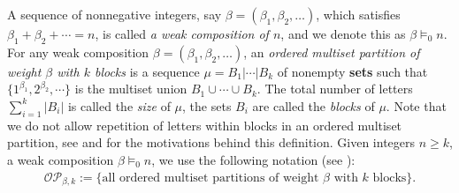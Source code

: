 \documentclass[12pt]{amsart}
\numberwithin{equation}{section}
\theoremstyle{plain}
\theoremstyle{definition}
\def\OP{\mathcal{OP}}
\begin{document}
A sequence of nonnegative integers, say $\beta=(\beta_1,\beta_2,\ldots)$, which satisfies $\beta_1+\beta_2+\cdots=n$, is called \emph{a weak composition of $n$}, and we denote this as $\beta\models_0 n$. For any weak composition $\beta=(\beta_1,\beta_2,\ldots)$, an \emph{ordered multiset partition of weight $\beta$ with $k$ blocks} is a sequence $\mu=B_1|\cdots|B_k$ of nonempty {\bf sets} such that $\{1^{\beta_1},2^{\beta_2},\cdots\}$ is the multiset union $B_1\cup \cdots \cup B_k$. The total number of letters $\sum_{i=1}^k|B_i|$ is called the \emph{size} of $\mu$, the sets $B_i$ are called the \emph{blocks} of $\mu$. Note that we do not allow repetition of letters within blocks in an ordered multiset partition, see \cite{HRW} and \cite{Rh} for the motivations behind this definition. Given integers $n\ge k$, a weak composition $\beta\models_0 n$, we use the following notation (see \cite{Rh}):
\begin{align*}
\OP_{\beta,k} :=\{\text{all ordered multiset partitions of weight $\beta$ with $k$ blocks}\}.
\end{align*}
\end{document}
